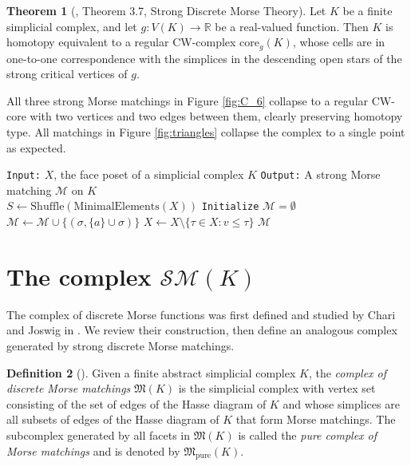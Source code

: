 \documentclass{amsart}
\theoremstyle{definition}
\newtheorem{theorem}{Theorem}[section]
\newtheorem{definition}[theorem]{Definition}
\newcommand{\sm}{{\mathcal{SM}}}
\begin{document}
\begin{theorem}[\cite{Fernandez2026}, Theorem 3.7, Strong Discrete Morse Theory]
Let $K$ be a finite simplicial complex, and let $g:V(K)\to\mathbb{R}$ be a real-valued function. Then $K$ is homotopy equivalent to a regular CW-complex core$_g(K)$, whose cells are in one-to-one correspondence with the simplices in the descending open stars of the strong critical vertices of $g$.
\end{theorem}

All three strong Morse matchings in Figure \ref{fig:C_6} collapse to a regular CW-core with two vertices and two edges between them, clearly preserving homotopy type. All matchings in Figure \ref{fig:triangles} collapse the complex to a single point as expected.

\begin{algorithm}[htb!]
\caption{A random strong Morse matching \cite{Fernandez2026}}
\label{alg:internal_core_computation}
\begin{algorithmic}
\State \verb"Input:" $X$, the face poset of a simplicial complex $K$
\State \verb"Output:" A strong Morse matching ${\mathcal M}$ on $K$
\\
    \State $S \gets \text{Shuffle}(\text{MinimalElements}(X))$ 
    \State \verb"Initialize" ${\mathcal M}=\emptyset$
                \State ${\mathcal M} \gets {\mathcal M} \cup \{ (\sigma, \{a\}\cup\sigma) \}$
            \EndFor
            \State $X \gets X \setminus \{ \tau \in X \colon v \leq \tau \}$
        \EndIf
    \EndFor
    \State \Return ${\mathcal M}$
\end{algorithmic}
\end{algorithm}

\section{The complex $\sm(K)$}\label{sec:smk}

The complex of discrete Morse functions was first defined and studied by Chari and Joswig in \cite{ChariJoswig2005}. We review their construction, then define an analogous complex generated by strong discrete Morse matchings.


\begin{definition}[\cite{ChariJoswig2005}]
Given a finite abstract simplicial complex $K$, the \textit{complex of discrete Morse matchings} $\mathfrak{M}(K)$ is the simplicial complex with vertex set consisting of the set of edges of the Hasse diagram of $K$ and whose simplices are all subsets of edges of the Hasse diagram of $K$ that form Morse matchings. The subcomplex generated by all facets in ${\mathfrak M}(K)$ is called the {\em pure complex of Morse matchings} and is denoted by ${\mathfrak M}_{\textrm{pure}}(K)$.
\end{definition}
\end{document}
